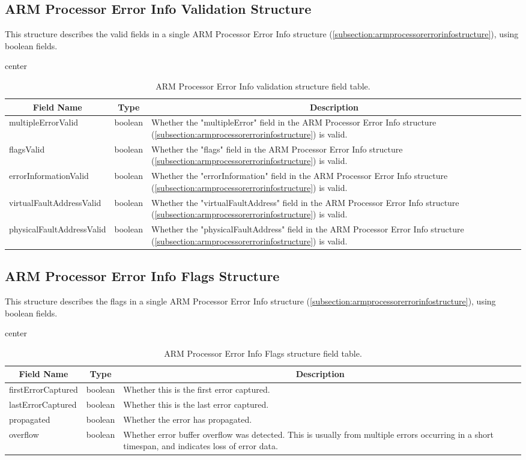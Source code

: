 \documentclass{report}
\newcommand*{\thead}[1]{\multicolumn{1}{|c|}{\bfseries #1}}
\newcommand*{\jsontable}[1]{
    \begin{table}[!ht]
    \label{#1}
    \centering
    \begin{adjustbox}{center}
    \begin{tabular}{|l|c|p{8cm}|}
    \hline
    \thead{Field Name} & \thead{Type} & \thead{Description} \\
    \hline
}
\newcommand*{\jsontableend}[1]{
    \hline
    \end{tabular}
    \end{adjustbox}
    \caption{#1}
    \label{table:#1}
    \end{table}
    \FloatBarrier
}
\begin{document}
\subsection{ARM Processor Error Info Validation Structure}
\label{subsection:armprocessorerrorinfovalidationstructure}
This structure describes the valid fields in a single ARM Processor Error Info structure (\ref{subsection:armprocessorerrorinfostructure}), using boolean fields.
\jsontable{table:armprocessorerrorinfovalidationstructure}
multipleErrorValid & boolean & Whether the "multipleError" field in the ARM Processor Error Info structure (\ref{subsection:armprocessorerrorinfostructure}) is valid.\\
\hline
flagsValid & boolean & Whether the "flags" field in the ARM Processor Error Info structure (\ref{subsection:armprocessorerrorinfostructure}) is valid.\\
\hline
errorInformationValid & boolean & Whether the "errorInformation" field in the ARM Processor Error Info structure (\ref{subsection:armprocessorerrorinfostructure}) is valid.\\
\hline
virtualFaultAddressValid & boolean & Whether the "virtualFaultAddress" field in the ARM Processor Error Info structure (\ref{subsection:armprocessorerrorinfostructure}) is valid.\\
\hline
physicalFaultAddressValid & boolean & Whether the "physicalFaultAddress" field in the ARM Processor Error Info structure (\ref{subsection:armprocessorerrorinfostructure}) is valid.\\
\jsontableend{ARM Processor Error Info validation structure field table.}

\subsection{ARM Processor Error Info Flags Structure}
\label{subsection:armprocessorerrorinfoflagsstructure}
This structure describes the flags in a single ARM Processor Error Info structure (\ref{subsection:armprocessorerrorinfostructure}), using boolean fields.
\jsontable{table:armprocessorerrorinfoflagsstructure}
firstErrorCaptured & boolean & Whether this is the first error captured.\\
\hline
lastErrorCaptured & boolean & Whether this is the last error captured.\\
\hline
propagated & boolean & Whether the error has propagated.\\
\hline
overflow & boolean & Whether error buffer overflow was detected. This is usually from multiple errors occurring in a short timespan, and indicates loss of error data.\\
\jsontableend{ARM Processor Error Info Flags structure field table.}
\end{document}
